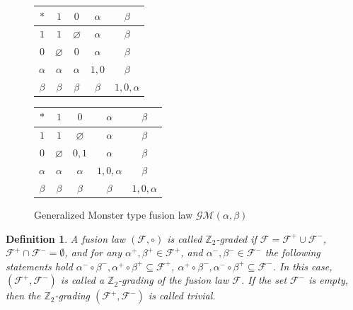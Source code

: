 \documentclass[12pt]{article}
\newcommand\Z{\mathbb{Z}}
\newtheorem{defi}{Definition}
\begin{document}
\begin{figure}[ht]
	\centering
	\begin{minipage}{0.45\textwidth}
		\centering
		\renewcommand{\arraystretch}{1.3}
		\begin{tabular}{|c||c|c|c|c|}
			\hline
			$\ast$ & $1$ & $0$ & $\alpha$ & $\beta$ \\
			\hline\hline
			$1$ & $1$ & $\varnothing$ & $\alpha$ & $\beta$ \\
			\hline
			$0$ & $\varnothing$ & $0$ & $\alpha$ & $\beta$ \\
			\hline
			$\alpha$ & $\alpha$ & $\alpha$ & $1,0$ & $\beta$ \\
			\hline
			$\beta$ & $\beta$ & $\beta$ & $\beta$ & $1,0,\alpha$ \\
			\hline
		\end{tabular}
		\caption{Monster type fusion law $\mathcal{M}(\alpha,\beta)$}\label{M}
		\label{fig:M1}
	\end{minipage}
	\hfill
	\begin{minipage}{0.45\textwidth}
		\centering
		\renewcommand{\arraystretch}{1.3}
		\begin{tabular}{|c||c|c|c|c|}
			\hline
			$\ast$ & $1$ & $0$ & $\alpha$ & $\beta$ \\
			\hline\hline
			$1$ & $1$ & $\varnothing$ & $\alpha$ & $\beta$ \\
			\hline
			$0$ & $\varnothing$ & $0,1$ & $\alpha$ & $\beta$ \\
			\hline
			$\alpha$ & $\alpha$ & $\alpha$ & $1,0,\alpha$ & $\beta$ \\
			\hline
			$\beta$ & $\beta$ & $\beta$ & $\beta$ & $1,0,\alpha$ \\
			\hline
		\end{tabular}
		\caption{Generalized Monster type fusion law $\mathcal{GM}(\alpha,\beta)$} \label{GM}
		\label{fig:GM1}
	\end{minipage}
\end{figure}

\begin{defi}
A fusion law $(\mathcal{F},\circ)$ is called $\Z_2$-graded if $\mathcal{F}=\mathcal{F}^+\cup\mathcal{{F}^-}$, $\mathcal{F}^+\cap\mathcal{F}^-=\emptyset$, and for any $\alpha^+,\beta^+\in \mathcal{F}^+$, and $\alpha^-,\beta^-\in \mathcal{F}^-$ the following statements hold $\alpha^-\circ\beta^-, \alpha^+\circ\beta^+\subseteq \mathcal{F}^+$, $\alpha^+\circ\beta^-,\alpha^-\circ\beta^+\subseteq\mathcal{F}^-$. In this case, $(\mathcal{F}^+,\mathcal{F}^-)$ is called a $\Z_2$-grading of the fusion law $\mathcal{F}$. If the set $\mathcal{F}^-$ is empty, then the $\Z_2$-grading $(\mathcal{F}^+,\mathcal{F}^-)$ is called trivial. 
\end{defi}
\end{document}

